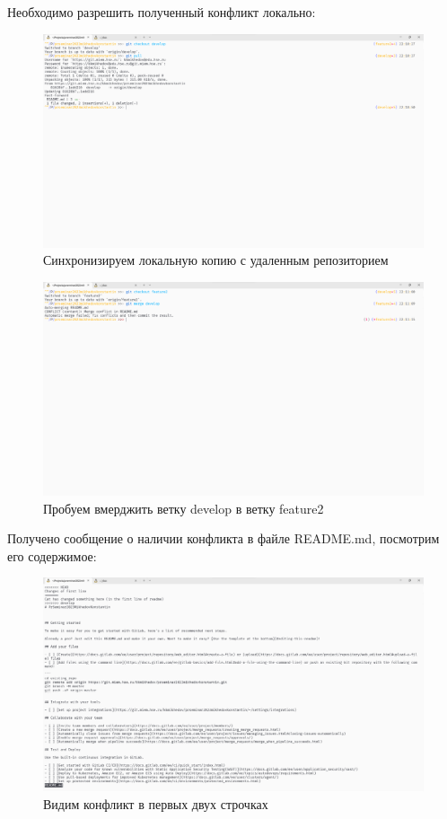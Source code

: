 \documentclass[a4paper]{article}
\begin{document}
  Необходимо разрешить полученный конфликт локально:

  \begin{figure}[H]
    \centering
    \includegraphics[width=\textwidth]{1_ (13)}
    \caption{Синхронизируем локальную копию с удаленным репозиторием}
  \end{figure}

  \begin{figure}[H]
    \centering
    \includegraphics[width=\textwidth]{1_ (12)}
    \caption{Пробуем вмерджить ветку develop в ветку feature2}
  \end{figure}

  Получено сообщение о наличии конфликта в файле README.md, посмотрим его содержимое:

  \begin{figure}[H]
    \centering
    \includegraphics[width=\textwidth]{1_ (11)}
    \caption{Видим конфликт в первых двух строчках}
  \end{figure}
\end{document}
